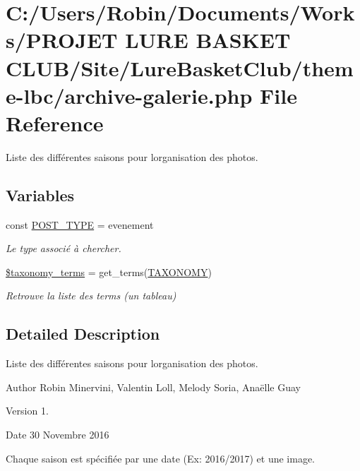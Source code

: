 \hypertarget{archive-galerie_8php}{}\section{C\+:/\+Users/\+Robin/\+Documents/\+Works/\+P\+R\+O\+J\+ET L\+U\+RE B\+A\+S\+K\+ET C\+L\+U\+B/\+Site/\+Lure\+Basket\+Club/theme-\/lbc/archive-\/galerie.php File Reference}
\label{archive-galerie_8php}


Liste des différentes saisons pour l\textquotesingle{}organisation des photos.  


\subsection*{Variables}
\begin{DoxyCompactItemize}
\item 
const \hyperlink{archive-galerie_8php_aef7d3346406e86714e365321541f4d97}{P\+O\+S\+T\+\_\+\+T\+Y\+PE} = \textquotesingle{}evenement\textquotesingle{}
\begin{DoxyCompactList}\small\item\em Le type associé à chercher. \end{DoxyCompactList}\item 
\hyperlink{archive-galerie_8php_a1bb9ed78e368f91696e146ce36663486}{\$taxonomy\+\_\+terms} = get\+\_\+terms(\hyperlink{archive-matchs_8php_a1dc6041def2926dbb45188d4f766d4b3}{T\+A\+X\+O\+N\+O\+MY})
\begin{DoxyCompactList}\small\item\em Retrouve la liste des terms (un tableau) \end{DoxyCompactList}\end{DoxyCompactItemize}


\subsection{Detailed Description}
Liste des différentes saisons pour l\textquotesingle{}organisation des photos. 

\begin{DoxyAuthor}{Author}
Robin Minervini, Valentin Loll, Melody Soria, Anaëlle Guay 
\end{DoxyAuthor}
\begin{DoxyVersion}{Version}
1. 
\end{DoxyVersion}
\begin{DoxyDate}{Date}
30 Novembre 2016
\end{DoxyDate}
Chaque saison est spécifiée par une date (Ex\+: 2016/2017) et une image. 

